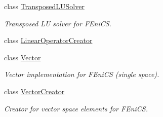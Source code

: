 \begin{DoxyCompactItemize}
class \hyperlink{classSpacy_1_1FEniCS_1_1TransposedLUSolver}{Transposed\-L\-U\-Solver}
\begin{DoxyCompactList}\small\item\em Transposed L\-U solver for F\-Eni\-C\-S. \end{DoxyCompactList}\item 
class \hyperlink{classSpacy_1_1FEniCS_1_1LinearOperatorCreator}{Linear\-Operator\-Creator}
\item 
class \hyperlink{classSpacy_1_1FEniCS_1_1Vector}{Vector}
\begin{DoxyCompactList}\small\item\em Vector implementation for F\-Eni\-C\-S (single space). \end{DoxyCompactList}\item 
class \hyperlink{classSpacy_1_1FEniCS_1_1VectorCreator}{Vector\-Creator}
\begin{DoxyCompactList}\small\item\em Creator for vector space elements for F\-Eni\-C\-S. \end{DoxyCompactList}\end{DoxyCompactItemize}
